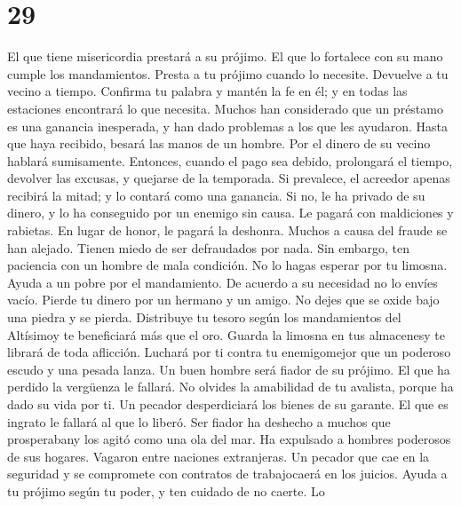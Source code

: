 \hypertarget{section-28}{%
\section{29}\label{section-28}}

 El que tiene misericordia prestará a su prójimo. El que
lo fortalece con su mano cumple los mandamientos.  Presta
a tu prójimo cuando lo necesite. Devuelve a tu vecino a tiempo.
 Confirma tu palabra y mantén la fe en él; y en todas las
estaciones encontrará lo que necesita.  Muchos han
considerado que un préstamo es una ganancia inesperada, y han dado
problemas a los que les ayudaron.  Hasta que haya
recibido, besará las manos de un hombre. Por el dinero de su vecino
hablará sumisamente. Entonces, cuando el pago sea debido, prolongará el
tiempo, devolver las excusas, y quejarse de la temporada. 
Si prevalece, el acreedor apenas recibirá la mitad; y lo contará como
una ganancia. Si no, le ha privado de su dinero, y lo ha conseguido por
un enemigo sin causa. Le pagará con maldiciones y rabietas. En lugar de
honor, le pagará la deshonra.  Muchos a causa del fraude
se han alejado. Tienen miedo de ser defraudados por nada. 
Sin embargo, ten paciencia con un hombre de mala condición. No lo hagas
esperar por tu limosna.  Ayuda a un pobre por el
mandamiento. De acuerdo a su necesidad no lo envíes vacío.
 Pierde tu dinero por un hermano y un amigo. No dejes que
se oxide bajo una piedra y se pierda.  Distribuye tu
tesoro según los mandamientos del Altísimoy te beneficiará más que el
oro.  Guarda la limosna en tus almacenesy te librará de
toda aflicción.  Luchará por ti contra tu enemigomejor
que un poderoso escudo y una pesada lanza.  Un buen
hombre será fiador de su prójimo. El que ha perdido la vergüenza le
fallará.  No olvides la amabilidad de tu avalista, porque
ha dado su vida por ti.  Un pecador desperdiciará los
bienes de su garante.  El que es ingrato le fallará al
que lo liberó.  Ser fiador ha deshecho a muchos que
prosperabany los agitó como una ola del mar. Ha expulsado a hombres
poderosos de sus hogares. Vagaron entre naciones extranjeras.
 Un pecador que cae en la seguridad y se compromete con
contratos de trabajocaerá en los juicios.  Ayuda a tu
prójimo según tu poder, y ten cuidado de no caerte.  Lo
